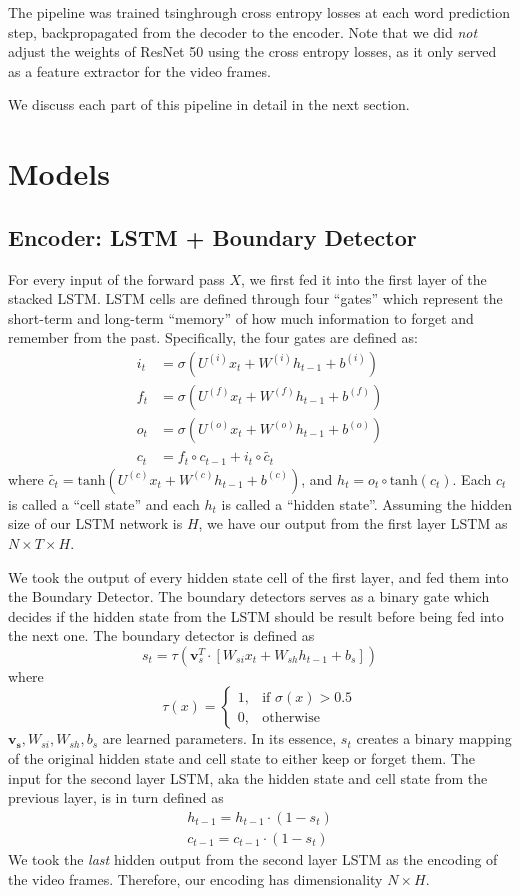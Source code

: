 \documentclass[11pt,a4paper]{article}
\begin{document}
The pipeline was trained tsinghrough cross entropy losses at each word prediction step, backpropagated from the decoder to the encoder. Note that we did \emph{not} adjust the weights of ResNet 50 using the cross entropy losses, as it only served as a feature extractor for the video frames. 

We discuss each part of this pipeline in detail in the next section. 

\section{Models}

\subsection{Encoder: LSTM + Boundary Detector}

For every input of the forward pass $X$, we first fed it into the first layer of the stacked LSTM. LSTM cells are defined through four ``gates'' which represent the short-term and long-term ``memory'' of how much information to forget and remember from the past. Specifically, the four gates are defined as:
\begin{align*}
    i_t &= \sigma(U^{(i)}x_t + W^{(i)}h_{t-1} + b^{(i)}) \\
    f_t &= \sigma(U^{(f)}x_t + W^{(f)}h_{t-1} + b^{(f)}) \\ 
    o_t &= \sigma(U^{(o)}x_t + W^{(o)}h_{t-1} + b^{(o)}) \\ 
    c_t &= f_t \circ c_{t-1} + i_t \circ \tilde{c_t}
\end{align*}
where $\tilde{c_t} = \text{tanh}(U^{(c)}x_t + W^{(c)}h_{t-1} + b^{(c)})$, and $h_t = o_t \circ \text{tanh}(c_t)$. Each $c_t$ is called a ``cell state'' and each $h_t$ is called a ``hidden state''. Assuming the hidden size of our LSTM network is $H$, we have our output from the first layer LSTM as $N\times T\times H$. 

We took the output of every hidden state cell of the first layer, and fed them into the Boundary Detector. The boundary detectors serves as a binary gate which decides if the hidden state from the LSTM should be result before being fed into the next one. The boundary detector is defined as 
\[s_t = \tau(\mathbf{v}^T_s \cdot [W_{si}x_t + W_{sh}h_{t-1} + b_s])\]
where 
\[\tau(x) =
\begin{cases}
1, &\text{if } \sigma(x) > 0.5 \\
0, &\text{otherwise}
\end{cases}\]
$\mathbf{v_s}, W_{si}, W_{sh}, b_s$ are learned parameters. In its essence, $s_t$ creates a binary mapping of the original hidden state and cell state to either keep or forget them. The input for the second layer LSTM, aka the hidden state and cell state from the previous layer, is in turn defined as 
\begin{align*}
h_{t-1} = h_{t-1} \cdot (1 - s_t) \\
c_{t-1} = c_{t-1} \cdot (1 - s_t)    
\end{align*}
We took the \emph{last} hidden output from the second layer LSTM as the encoding of the video frames. Therefore, our encoding has dimensionality $N \times H$. 
\end{document}
